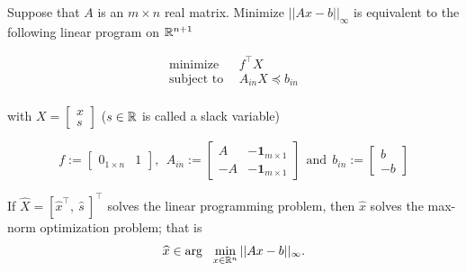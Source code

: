 \begin{tcolorbox}[title = Linear Program for ${\bf\ell}_\infty$-\textbf{norm:} {$||x||_\infty = \max_{1 \le i \le n} |x_i| $}]

Suppose that $A$ is an $m \times n$ real matrix. Minimize $||Ax - b||_\infty$ is equivalent to the following linear program on $\mathbb R^{n+1}$

\begin{align*}
\text{minimize}& ~~ f^\top X\\
\text{subject to} &~~A_{in} X \preceq b_{in} \\
\end{align*}

with $X = \left[\begin{array}{c}  x\\ s \end{array} \right]$ ($s\in \mathbb R$ is called a slack variable)

$$f:=\left[ \begin{array}{cc}0_{1 \times n} & 1 \end{array} \right], ~~A_{in}:= \left[ \begin{array}{rr}  A  & -\textbf{1}_{m \times 1}  \\
 -A  & -\textbf{1}_{m \times 1}\end{array} \right] ~~\text{and}~~ b_{in}:=\left[\begin{array}{r}  b\\ -b \end{array} \right]$$

If $\widehat{X}=[\widehat{x}^\top, ~ \widehat{s} \ ]^\top $  solves the linear programming problem, then  $\widehat{x}$ solves the max-norm optimization problem; that is
$$ \widehat{x} \in  {\rm arg}~~\min_{x \in \mathbb R^n} ||Ax - b||_\infty.$$
\end{tcolorbox} 